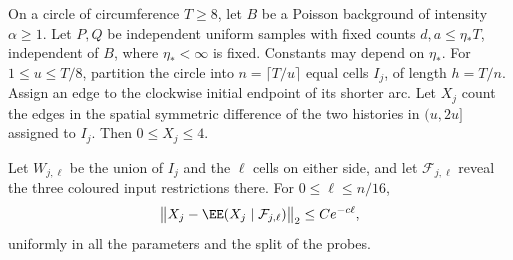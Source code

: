 \documentclass[11pt,letterpaper]{article}
\begin{document}
\begin{lemma}
\label{lem:late-band-locality}
On a circle of circumference $T\ge8$, let $B$ be a Poisson
background of intensity $\alpha\ge1$. Let $P,Q$ be independent
uniform samples with fixed counts $d,a\le\eta_*T$, independent of $B$,
where $\eta_*<\infty$ is fixed. Constants may depend on $\eta_*$.
For $1\le u\le T/8$, partition the circle into
$n=\lceil T/u\rceil$ equal cells $I_j$, of length $h=T/n$.
Assign an edge to the clockwise initial endpoint of its shorter
arc. Let $X_j$ count the edges in the spatial symmetric
difference of the two histories in $(u,2u]$ assigned to $I_j$.
Then $0\le X_j\le4$.

Let $W_{j,\ell}$ be the union of $I_j$ and the $\ell$ cells
on either side, and let $\mathcal F_{j,\ell}$ reveal the
three coloured input restrictions there. For
$0\le\ell\le n/16$,
\begin{equation}\label{eq:late-band-locality}
 \bigl\|X_j-\EE(X_j\mid\mathcal F_{j,\ell})\bigr\|_2
                  \le Ce^{-c\ell},
\end{equation}
uniformly in all the parameters and the split of the probes.
\end{lemma}
\end{document}
